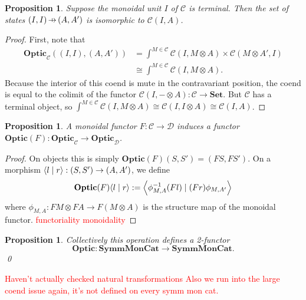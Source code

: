 \documentclass[11pt,a4paper]{article}
\theoremstyle{plain}
\newtheorem{proposition}[theorem]{Proposition}
\theoremstyle{definition}
\newtheorem{remark}[theorem]{Remark}
\newcommand{\C}{\mathscr{C}}
\newcommand{\D}{\mathscr{D}}
\newcommand{\Set}{\mathbf{Set}}
\newcommand{\SymmMonCat}{\mathbf{SymmMonCat}}
\newcommand{\Optic}{\mathbf{Optic}}
\newcommand{\rep}[2]{{\ensuremath \left\langle #1 \mid #2 \right\rangle}}
\newcommand{\hto}{\ensuremath{\,\mathaccent\shortmid\rightarrow\,}}
\newcommand{\todo}[1]{\textcolor{red}{\small #1}}
\begin{document}
\begin{proposition}
  Suppose the monoidal unit $I$ of $\C$ is terminal. Then the set of states $(I, I) \hto (A, A')$ is isomorphic to $\C(I, A)$.
\end{proposition}
\begin{proof}
  First, note that
  \begin{align*}
    \Optic_\C((I,I), (A,A'))
    &= \int^{M \in \C} \C(I, M \otimes A) \times \C(M \otimes A', I) \\
    &\cong \int^{M \in \C} \C(I, M \otimes A).
  \end{align*}
  Because the interior of this coend is mute in the contravariant position, the coend is equal to the colimit of the functor $\C(I, - \otimes A) : \C \to \Set$. But $\C$ has a terminal object, so $\int^{M \in \C} \C(I, M \otimes A) \cong \C(I, I \otimes A) \cong \C(I, A)$.
\end{proof}


\begin{proposition}\label{prop-change-of-action-monoidal}
  A monoidal functor $F : \C \to \D$ induces a functor $\Optic(F) : \Optic_\C \to \Optic_\D$.
\end{proposition}
\begin{proof}
  On objects this is simply $\Optic(F)(S, S') = (FS, FS')$. On a morphism $\rep{l}{r} : (S, S') \to (A, A')$, we define
  \begin{align*}
    \Optic(F)\rep{l}{r} := \rep{\phi^{-1}_{M,A} (Fl)}{(Fr) \phi_{M,A'}}
  \end{align*}
  where $\phi_{M,A} : FM \otimes FA \to F(M \otimes A)$ is the structure map of the monoidal functor.
  \todo{functoriality}
  \todo{monoidality}
\end{proof}

\begin{proposition}\label{prop-optic-functor}
  Collectively this operation defines a 2-functor \[\Optic : \SymmMonCat \to \SymmMonCat.\] \qed
\end{proposition}
\todo{Haven't actually checked natural transformations}
\todo{Also we run into the large coend issue again, it's not defined on every symm mon cat.}
\end{document}
